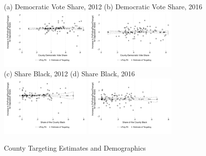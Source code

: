 \documentclass[12pt]{article}
\begin{document}
\begin{figure}[h!]
	\begin{center}
    \label{figure_county_demographics}
	\caption{County Targeting Estimates and Demographics}
  \vspace{.1in} \small
    (a) Democratic Vote Share, 2012 \hspace*{.8in} (b) Democratic Vote Share, 2016 \\
		    \includegraphics[width=0.4\textwidth]{../../50_results_full/countyestimates_party_dem_2012.pdf}
        \includegraphics[width=0.4\textwidth]{../../50_results_full/countyestimates_party_dem_2016.pdf}\\
        \smallskip
        (c) Share Black, 2012 \hspace*{1.5in} (d) Share Black, 2016 \\
        \smallskip
        \includegraphics[width=0.4\textwidth]{../../50_results_full/countyestimates_race_black_2012.pdf} \includegraphics[width=0.4\textwidth]{../../50_results_full/countyestimates_race_black_2016.pdf} \\

\end{center}
\end{figure}
\end{document}
